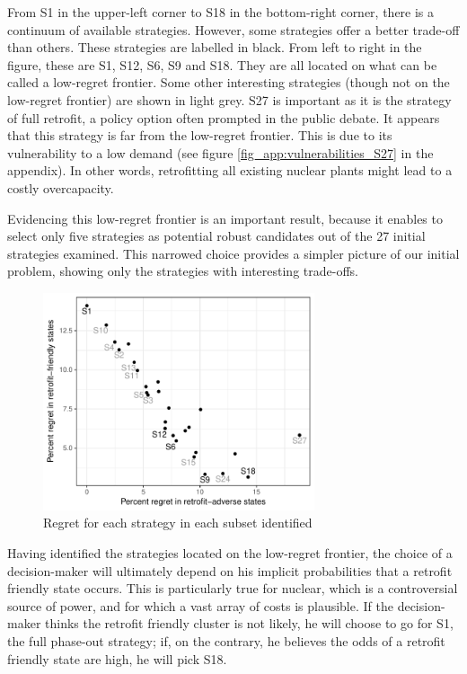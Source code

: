 From S1 in the upper-left corner to S18 in the bottom-right corner, there is a continuum of available strategies. 
However, some strategies offer a better trade-off than others. 
These strategies are labelled in black. From left to right in the figure, these are S1, S12, S6, S9 and S18. 
They are all located on what can be called a low-regret frontier. 
Some other interesting strategies (though not on the low-regret frontier) are shown in light grey. 
S27 is important as it is the strategy of full retrofit, a policy option often prompted in the public debate. 
It appears that this strategy is far from the low-regret frontier. 
This is due to its vulnerability to a low demand (see figure \ref{fig_app:vulnerabilities_S27} in the appendix). In other words, retrofitting all existing nuclear plants might lead to a costly overcapacity.

Evidencing this low-regret frontier is an important result, because it enables to select only five strategies as potential robust candidates out of the 27 initial strategies examined. This narrowed choice provides a simpler picture of our initial problem, showing only the strategies with interesting trade-offs.

\begin{figure}[!ht]
	\centering
	\includegraphics[width=8cm]{figures/low_regret_frontier_S9.pdf}
	\caption{Regret for each strategy in each subset identified}
	\label{fig:low_regret_frontier_S9}
\end{figure}

Having identified the strategies located on the low-regret frontier, the choice of a decision-maker will ultimately depend on his implicit probabilities that a retrofit friendly state occurs. 
This is particularly true for nuclear, which is a controversial source of power, and for which a vast array of costs is plausible. 
If the decision-maker thinks the retrofit friendly cluster is not likely, he will choose to go for S1, the full phase-out strategy; if, on the contrary, he believes the odds of a retrofit friendly state are high, he will pick S18. 

